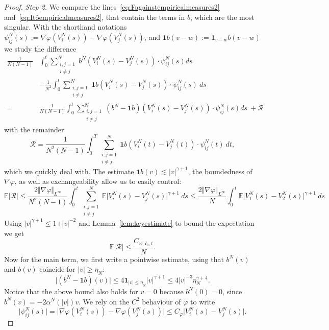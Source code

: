 \documentclass[11pt,a4paper]{article}
\theoremstyle{definition}
\theoremstyle{plain}
\begin{document}
\begin{proof}
    \textit{Step 2.} We compare the lines~\eqref{eq:Fagainstempiricalmeasures2} and~\eqref{eq:Itôempiricalmeasures2}, that contain the terms in $b$, which are the most singular. With the shorthand notations $\psi^N_{ij}(s):=\nabla\varphi(V^N_i(s))-\nabla\varphi(V^N_j(s))$, and $\mathbf{1}b(v-w):=\mathbf{1}_{v-w}b(v-w)$ we study the difference
    \begin{align*}
        \frac{1}{N(N-1)}&\int_0^t \sum_{\substack{i,j=1\\ i\neq j}}^N  b^N\left(V^N_i(s) -V^N_j(s)\right) \cdot \psi^N_{ij}(s) ds\\
        &-\frac{1}{N^2}\int_0^t \sum_{\substack{i,j=1\\ i\neq j}}^N \mathbf{1}b(V^N_i(s)-V^N_j(s)) \cdot \psi^N_{ij}(s)\ ds\\=
        &\frac{1}{N(N-1)} \int_0^t \sum_{\substack{i,j=1\\ i\neq j}}^N  (b^N-\mathbf{1}b)\left(V^N_i(s) -V^N_j(s)\right) \cdot \psi^N_{ij}(s) ds \ + \mathcal{R}
    \end{align*}
    with the remainder
    $$\mathcal{R}= \frac{1}{N^2(N-1)} \int_0^T \sum_{\substack{i,j=1\\ i\neq j}}^N \mathbf{1}b(V^N_i(t)-V^N_j(t)) \cdot \psi^N_{ij}(t)\ dt, $$
    which we quickly deal with.
    The estimate $\mathbf{1}b(v)\lesssim \vert v \vert^{\gamma+1}$, the boundedness of $\nabla\varphi$, as well as exchangeability allow us to easily control:
    $$\mathbb{E}\vert \mathcal{R} \vert \leq   \frac{2\Vert \nabla\varphi\Vert_{L^\infty}}{N^2(N-1)} \int_0^t \sum_{\substack{i,j=1\\ i\neq j}}^N \mathbb{E}\vert V^N_i(s)-V^N_j(s) \vert^{\gamma+1}\ ds \leq \frac{2\Vert \nabla\varphi\Vert_{L^\infty}}{N} \int_0^t \mathbb{E}\vert V^N_1(s)-V^N_2(s) \vert^{\gamma+1}\ ds$$
    Using $\vert v \vert^{\gamma+1} \leq 1 + \vert v \vert^{-2}$ and Lemma~\ref{lem:keyestimate} to bound the expectation we get
    $$\mathbb{E}\vert \mathcal{R} \vert \leq \frac{C_{\varphi,I_0,t}}{N}.$$
    Now for the main term, we first write a pointwise estimate, using that $b^N(v)$ and $b(v)$ coincide for $\vert v\vert\geq \eta_N$:
    $$\vert (b^N - \mathbf{1}b)(v)\vert \leq 4 \mathbf{1}_{\vert v \vert \leq \eta_N}\vert v \vert^{\gamma + 1}  \leq 4 \vert v \vert^{-3} \eta_N^{\gamma+4}.$$
    Notice that the above bound also holds for $v=0$ because $b^N(0)=0$, since $b^N(v)=-2\alpha^N(\vert v\vert)v$.
    We rely on the $C^2$ behaviour of $\varphi$ to write
    $$\vert \psi^N_{ij}(s)\vert=\vert\nabla\varphi(V^N_i(s))-\nabla\varphi(V^N_j(s))\vert \leq C_\varphi\vert V^N_i(s)-V^N_j(s)\vert.  $$

\end{proof}
\end{document}
